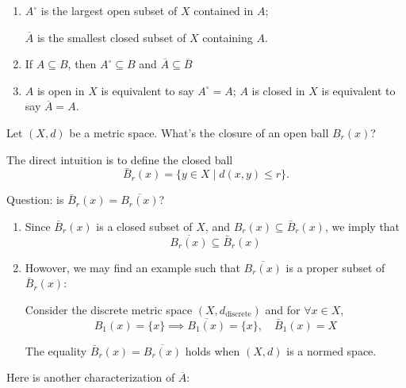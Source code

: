 \begin{proposition}
\begin{enumerate}
\item
$A^\circ$ is the largest open subset of $X$ contained in $A$;

$\overline{A}$ is the smallest closed subset of $X$ containing $A$.
\item
If $A\subseteq B$, then $A^\circ\subseteq B$ and $\overline{A}\subseteq\overline{B}$
\item
$A$ is open in $X$ is equivalent to say $A^\circ = A$; $A$ is closed in $X$ is equivalent to say $\overline{A}=A$.
\end{enumerate}
\end{proposition}

\begin{example}
Let $(X,d)$ be a metric space. What's the closure of an open ball $B_r(x)$?

The direct intuition is to define the closed ball
\[
\bar B_r(x)=\{y\in X\mid d(x,y)\le r\}.
\]

Question: is $\bar B_r(x)=\overline{B_r(x)}$?
\begin{enumerate}
\item
Since $\bar B_r(x)$ is a closed subset of $X$, and 
$B_r(x)\subseteq \bar B_r(x)$, 
we imply that
\[
\overline{B_r(x)}\subseteq\bar B_r(x)
\]
\item
Howover, we may find an example such that $\overline{B_r(x)}$ is a proper subset of $\bar B_r(x)$:

Consider the discrete metric space $(X,d_{\text{discrete}})$ and for $\forall x\in X$,
\[
B_1(x)=\{x\}\implies
\overline{B_1(x)}=\{x\},\quad
\bar B_1(x)=X
\]

The equality $\bar B_r(x)=\overline{B_r(x)}$ holds when $(X,d)$ is a normed space.
\end{enumerate}
\end{example}

Here is another characterization of $\overline{A}$:

